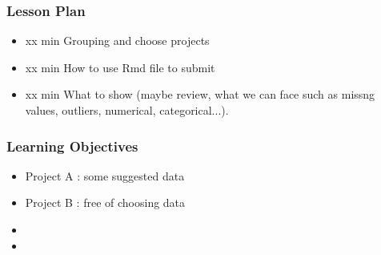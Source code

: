 

\begin{frame}
\frametitle{Lesson Plan}
\begin{itemize}
    \item xx min Grouping and choose projects 
    \item xx min How to use Rmd file to submit 
    \item xx min What to show (maybe review, what we can face such as missng values, outliers, numerical, categorical...).
\end{itemize}
\end{frame}


\begin{frame}
\frametitle{Learning Objectives}

\begin{itemize}
    \item Project A : some suggested data
    \item Project B : free of choosing data
    \item 
    \item 
\end{itemize}
\end{frame}

